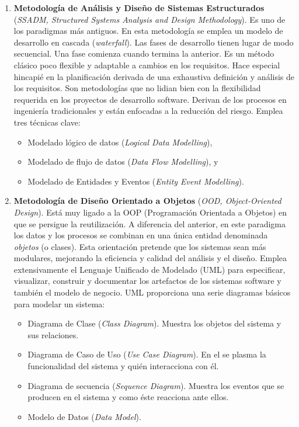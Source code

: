 \begin{enumerate}
\item \textbf{Metodología de Análisis y Diseño de Sistemas Estructurados} 
(\emph{SSADM, Structured Systems Analysis and Design 
Methodology}). Es uno de los paradigmas más antiguos. En esta 
metodología se emplea un modelo de desarrollo en cascada 
(\emph{waterfall}). Las fases de 
desarrollo tienen lugar de modo secuencial. Una fase comienza cuando termina 
la anterior. Es un método clásico poco flexible y adaptable a cambios en los 
requisitos. Hace especial hincapié en la planificación derivada de una 
exhaustiva definición y análisis de los requisitos. Son metodologías que no 
lidian bien con la flexibilidad requerida en los proyectos de desarrollo 
software. Derivan de los procesos en  ingeniería tradicionales y están 
enfocadas a la reducción del riesgo. Emplea tres técnicas clave:

\begin{itemize}
\item Modelado lógico de datos (\emph{Logical Data 
Modelling}),
\item Modelado de flujo de datos (\emph{Data Flow Modelling}), y
\item Modelado de Entidades y Eventos (\emph{Entity Event
  Modelling}).
\end{itemize} 

\item \textbf{Metodología de Diseño Orientado a Objetos} (\emph{OOD,  
Object-Oriented Design}). Está muy ligado a la OOP (Programación 
Orientada a Objetos) en que se persigue la reutilización. A diferencia del 
anterior, en este paradigma los datos y los procesos se combinan en una única 
entidad denominada \emph{objetos} (o clases). Esta orientación pretende que 
los sistemas sean más modulares, mejorando la eficiencia y calidad del 
análisis y el diseño. Emplea extensivamente el Lenguaje Unificado de Modelado 
(UML) para especificar, visualizar, construir y documentar los 
artefactos de los sistemas software y  también el modelo de negocio. UML 
proporciona una serie diagramas básicos para modelar un sistema: 

\begin{itemize}
\item Diagrama de Clase (\emph{Class Diagram}). Muestra los objetos del sistema y sus relaciones. 
\item Diagrama de Caso de Uso (\emph{Use Case Diagram}). En el se plasma la
  funcionalidad del sistema y quién interacciona con él.
\item Diagrama de secuencia (\emph{Sequence Diagram}). Muestra los eventos que se
  producen en el sistema y como éste reacciona ante ellos. 
\item Modelo de Datos (\emph{Data Model}).
\end{itemize} 
                               

\end{enumerate}
